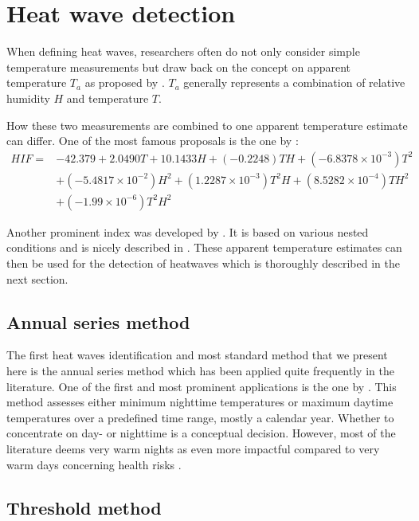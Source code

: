 \documentclass[12pt]{article}
\begin{document}
\section{Heat wave detection}

When defining heat waves, researchers often do not only consider simple temperature measurements but draw back on the concept on apparent temperature $T_a$ as proposed by \citet{steadman1984}. $T_a$ generally represents a combination of relative humidity $H$ and temperature $T$.

How these two measurements are combined to one apparent temperature estimate can differ. One of the most famous proposals is the one by \citet{el2007}:
\begin{equation}
\begin{aligned}
HIF = & -42.379 + 2.0490T + 10.1433H + (-0.2248)TH + (-6.8378 \times 10^{-3})T^2 \\
& + (-5.4817 \times 10^{-2})H^2 + (1.2287 \times 10^{-3})T^2H + (8.5282 \times 10^{-4})TH^2 \\
& + (-1.99 \times 10^{-6})T^2H^2
\end{aligned}
\end{equation}

Another prominent index was developed by \citet{nws2011}. It is based on various nested conditions and is nicely described in \citet{anderson2013}. These apparent temperature estimates can then be used for the detection of heatwaves which is thoroughly described in the next section.

\subsection{Annual series method}

The first heat waves identification and most standard method that we present here is the annual series method which has been applied quite frequently in the literature. One of the first and most prominent applications is the one by \citet{karl1997}. This method assesses either minimum nighttime temperatures or maximum daytime temperatures over a predefined time range, mostly a calendar year. Whether to concentrate on day- or nighttime is a conceptual decision. However, most of the literature deems very warm nights as even more impactful compared to very warm days concerning health risks \citep{mcmichael1996,henschel1969}. 

\subsection{Threshold method}
\end{document}
